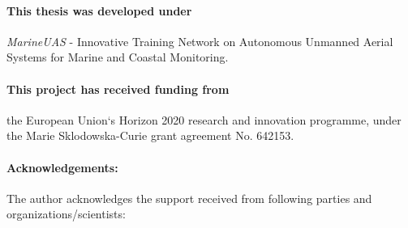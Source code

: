 \paragraph{This thesis was developed under} \emph{MarineUAS} - Innovative Training Network on Autonomous Unmanned Aerial Systems for Marine and Coastal Monitoring.

\paragraph{This project has received funding from} the European Union`s Horizon 2020 research and innovation programme, under the Marie Sklodowska-Curie grant agreement No. 642153. 

\paragraph{Acknowledgements:} The author acknowledges the support received from following parties and organizations/scientists:

